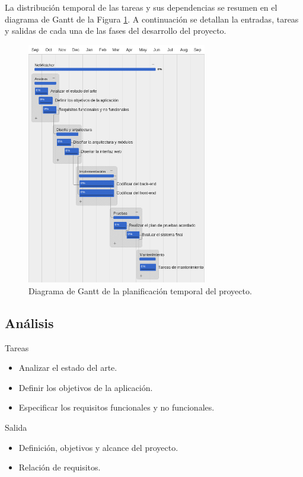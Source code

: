 La distribución temporal de las tareas y sus dependencias se resumen en el diagrama de Gantt de la Figura \ref{fig:gantt}.
A continuación se detallan la entradas, tareas y salidas de cada una de las fases del desarrollo del proyecto.

\begin{figure}[!htp]
  \centering
  \includegraphics[width=0.7\textwidth,clip=true]{graphics/gantt_white}
  \caption{Diagrama de Gantt de la planificación temporal del proyecto.}
  \label{fig:gantt}
\end{figure} 

\subsection*{Análisis\label{ssec:dp:analisis}}

Tareas
\begin{itemize}[leftmargin=3.5em]
  \item Analizar el estado del arte.
  \item Definir los objetivos de la aplicación.
  \item Especificar los requisitos funcionales y no funcionales.
\end{itemize}

Salida
\begin{itemize}[leftmargin=3.5em]
  \item Definición, objetivos y alcance del proyecto.
  \item Relación de requisitos.
\end{itemize}

